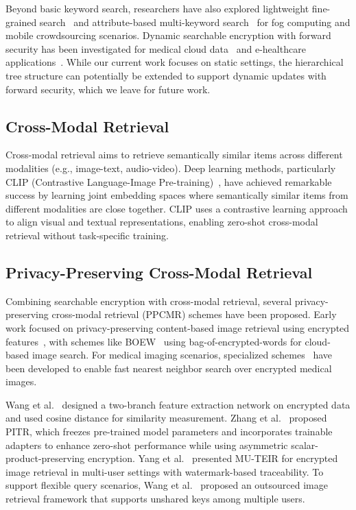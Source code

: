 \documentclass[journal]{IEEEtran}
\begin{document}
Beyond basic keyword search, researchers have also explored lightweight fine-grained search~\cite{miao2018lightweight} and attribute-based multi-keyword search~\cite{miao2017practical} for fog computing and mobile crowdsourcing scenarios. Dynamic searchable encryption with forward security has been investigated for medical cloud data~\cite{li2017achieving} and e-healthcare applications~\cite{wang2019secure}. While our current work focuses on static settings, the hierarchical tree structure can potentially be extended to support dynamic updates with forward security, which we leave for future work.

\subsection{Cross-Modal Retrieval}

Cross-modal retrieval aims to retrieve semantically similar items across different modalities (e.g., image-text, audio-video). Deep learning methods, particularly CLIP (Contrastive Language-Image Pre-training)~\cite{radford2021learning}, have achieved remarkable success by learning joint embedding spaces where semantically similar items from different modalities are close together. CLIP uses a contrastive learning approach to align visual and textual representations, enabling zero-shot cross-modal retrieval without task-specific training.

\subsection{Privacy-Preserving Cross-Modal Retrieval}

Combining searchable encryption with cross-modal retrieval, several privacy-preserving cross-modal retrieval (PPCMR) schemes have been proposed. Early work focused on privacy-preserving content-based image retrieval using encrypted features~\cite{xia2015towards,ferreira2019practical}, with schemes like BOEW~\cite{xia2019boew} using bag-of-encrypted-words for cloud-based image search. For medical imaging scenarios, specialized schemes~\cite{guo2021fast} have been developed to enable fast nearest neighbor search over encrypted medical images.

Wang et al.~\cite{wang2023privacy} designed a two-branch feature extraction network on encrypted data and used cosine distance for similarity measurement. Zhang et al.~\cite{zhang2024efficient} proposed PITR, which freezes pre-trained model parameters and incorporates trainable adapters to enhance zero-shot performance while using asymmetric scalar-product-preserving encryption. Yang et al.~\cite{yang2022mu} presented MU-TEIR for encrypted image retrieval in multi-user settings with watermark-based traceability. To support flexible query scenarios, Wang et al.~\cite{wang2019search} proposed an outsourced image retrieval framework that supports unshared keys among multiple users.
\end{document}
